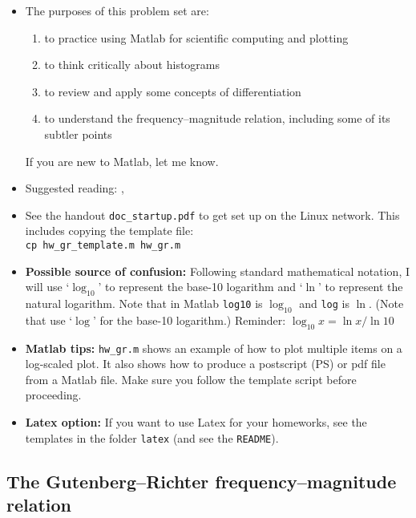 \documentclass[11pt,titlepage,fleqn]{article}
\begin{document}
\begin{itemize}

\item The purposes of this problem set are:
%
\begin{enumerate}
\item to practice using Matlab for scientific computing and plotting
\item to think critically about histograms
\item to review and apply some concepts of differentiation
\item to understand the frequency--magnitude relation, including some of its subtler points
\end{enumerate}
%
If you are new to Matlab, let me know.

\item Suggested reading: \citet[][Section 4.7.1]{SteinWysession}, \citet{GutenbergRichter1944}

\item See the handout \verb+doc_startup.pdf+ to get set up on the Linux network. This includes copying the template file: \\
\verb+cp hw_gr_template.m hw_gr.m+

\item {\bf Possible source of confusion:} Following standard mathematical notation, I will use `$\log_{10}$' to represent the base-10 logarithm and `$\ln$' to represent the natural logarithm. Note that in Matlab \verb+log10+ is $\log_{10}$ and \verb+log+ is $\ln$. (Note that \citet{SteinWysession} use `$\log$' for the base-10 logarithm.) Reminder: $\log_{10} x = \ln x / \ln 10$

\item {\bf Matlab tips:}
\verb+hw_gr.m+ shows an example of how to plot multiple items on a log-scaled plot. It also shows how to produce a postscript (PS) or pdf file from a Matlab file. Make sure you follow the template script before proceeding.

\item {\bf Latex option:}
If you want to use Latex for your homeworks, see the templates in the folder \verb+latex+ (and see the \verb+README+).

\end{itemize}


\pagebreak
\subsection*{The Gutenberg--Richter frequency--magnitude relation}
\end{document}
